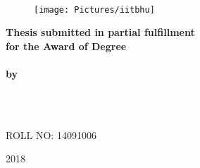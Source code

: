 \documentclass[12pt, a4paper, twoside]{Thesis_Gourav} %
\begin{document}
\begin{titlepage}
\begin{center}

{\Large \bfseries \ttitle}\\ %
 
  \vspace{11mm}
\graphicspath{ {./Figures/} }
\begin{figure}[hb]
  \centering
  \texttt{[image: Pictures/iitbhu]}
\end{figure} 
\vspace{3mm}
 
 
\normalsize \textbf{Thesis submitted in partial fulfillment\\
for the Award of Degree}\\ \Large{\textbf{\degreename}}\\[0.3cm] %

\vfill
\normalsize \textbf{by}\\
\href{https://sites.google.com/itbhu.ac.in/gourav-modanwal}{\normalsize \textbf{\authornames}}

\vfill


\normalsize{\textsc{\DEPTNAME\\ %
\UNIVNAME}}\\[1.5cm] %
\end{center}


\begin{minipage}{0.5\textwidth}
	ROLL NO: 14091006
\end{minipage}
\begin{minipage}{0.5\textwidth}
\begin{flushright} \large
		2018
	\end{flushright}
\end{minipage}


\end{titlepage}
\end{document}

